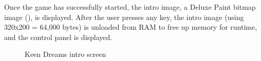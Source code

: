\documentclass[book.tex]{subfiles}
\begin{document}
\par
Once the game has successfully started, the intro image, a Deluxe Paint bitmap image (), is displayed. After the user presses any key, the intro image (using 320x200 = 64,000 bytes) is unloaded from RAM to free up memory for runtime, and the control panel is displayed.\\

\begin{figure}[H]
\centering
{}
\caption{Keen Dreams intro screen}
\end{figure}
\pagebreak
\end{document}
